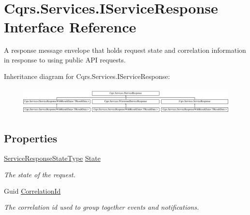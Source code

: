 \hypertarget{interfaceCqrs_1_1Services_1_1IServiceResponse}{}\section{Cqrs.\+Services.\+I\+Service\+Response Interface Reference}
\label{interfaceCqrs_1_1Services_1_1IServiceResponse}


A response message envelope that holds request state and correlation information in response to using public A\+PI requests.  


Inheritance diagram for Cqrs.\+Services.\+I\+Service\+Response\+:\begin{figure}[H]
\begin{center}
\leavevmode
\includegraphics[height=1.469816cm]{interfaceCqrs_1_1Services_1_1IServiceResponse}
\end{center}
\end{figure}
\subsection*{Properties}
\begin{DoxyCompactItemize}
\item 
\hyperlink{namespaceCqrs_1_1Services_a41411b784c4fcb7eed0cef2a5b522de0_a41411b784c4fcb7eed0cef2a5b522de0}{Service\+Response\+State\+Type} \hyperlink{interfaceCqrs_1_1Services_1_1IServiceResponse_a946aa90e8fcd82481944c571baaebb2e_a946aa90e8fcd82481944c571baaebb2e}{State}
\begin{DoxyCompactList}\small\item\em The state of the request. \end{DoxyCompactList}\item 
Guid \hyperlink{interfaceCqrs_1_1Services_1_1IServiceResponse_a5f6a02ee73059558e9859d7e5fe06025_a5f6a02ee73059558e9859d7e5fe06025}{Correlation\+Id}
\begin{DoxyCompactList}\small\item\em The correlation id used to group together events and notifications. \end{DoxyCompactList}\end{DoxyCompactItemize}


